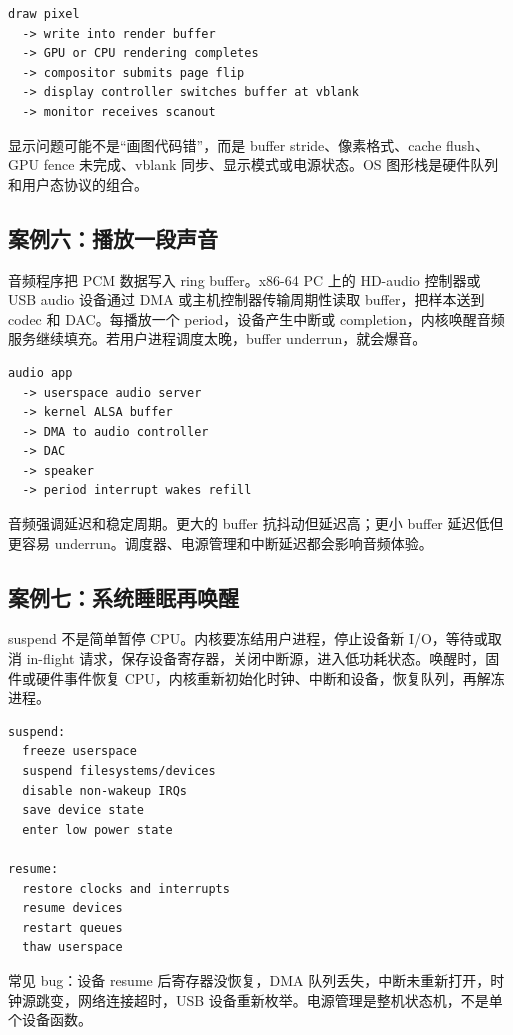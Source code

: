 \begin{lstlisting}
draw pixel
  -> write into render buffer
  -> GPU or CPU rendering completes
  -> compositor submits page flip
  -> display controller switches buffer at vblank
  -> monitor receives scanout
\end{lstlisting}

显示问题可能不是“画图代码错”，而是 buffer stride、像素格式、cache flush、GPU fence 未完成、vblank 同步、显示模式或电源状态。OS 图形栈是硬件队列和用户态协议的组合。

\subsection{案例六：播放一段声音}

音频程序把 PCM 数据写入 ring buffer。x86-64 PC 上的 HD-audio 控制器或 USB audio 设备通过 DMA 或主机控制器传输周期性读取 buffer，把样本送到 codec 和 DAC。每播放一个 period，设备产生中断或 completion，内核唤醒音频服务继续填充。若用户进程调度太晚，buffer underrun，就会爆音。

\begin{lstlisting}
audio app
  -> userspace audio server
  -> kernel ALSA buffer
  -> DMA to audio controller
  -> DAC
  -> speaker
  -> period interrupt wakes refill
\end{lstlisting}

音频强调延迟和稳定周期。更大的 buffer 抗抖动但延迟高；更小 buffer 延迟低但更容易 underrun。调度器、电源管理和中断延迟都会影响音频体验。

\subsection{案例七：系统睡眠再唤醒}

suspend 不是简单暂停 CPU。内核要冻结用户进程，停止设备新 I/O，等待或取消 in-flight 请求，保存设备寄存器，关闭中断源，进入低功耗状态。唤醒时，固件或硬件事件恢复 CPU，内核重新初始化时钟、中断和设备，恢复队列，再解冻进程。

\begin{lstlisting}
suspend:
  freeze userspace
  suspend filesystems/devices
  disable non-wakeup IRQs
  save device state
  enter low power state

resume:
  restore clocks and interrupts
  resume devices
  restart queues
  thaw userspace
\end{lstlisting}

常见 bug：设备 resume 后寄存器没恢复，DMA 队列丢失，中断未重新打开，时钟源跳变，网络连接超时，USB 设备重新枚举。电源管理是整机状态机，不是单个设备函数。

